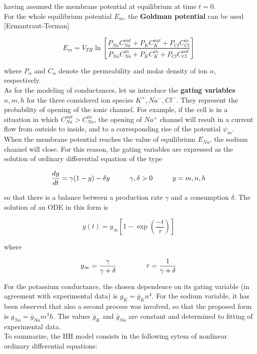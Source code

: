 \documentclass[a4paper]{article}
\begin{document}
	
	having assumed the membrane potential at equilibrium at time $t=0$.\\
	For the whole equilibrium potential $E_m$, the \textbf{Goldman potential} can be used [Ermantraut-Terman]
	
	
	\begin{equation}
	E_m= V_{TH} \ln \left[\frac{P_{Na} C_{Na}^{out} + P_{K} C_K^{out} + P_{Cl} C_{Cl}^{in}}{P_{Na} C_{Na}^{in} + P_{K} C_K^{in} + P_{Cl} C_{Cl}^{out}}\right]
	\end{equation}
	
	where $P_\alpha$ and $C_\alpha$  denote the permeability and molar density of ion $\alpha$, respectively.\\
	As for the modeling of conductances, let us introduce the \textbf{gating variables} $n,m,h$ for the three considered ion species $K^+,Na^-,Cl^-$. They represent the probability of opening of the ionic channel. For example, if the cell is in a situation in which $C_{Na}^{out} > C_{Na}^{in}$, the opening of $Na^+$ channel will result in a current flow from outside to inside, and to a corresponding rise of the potential $\psi_m$. When the membrane potential reaches the value of equilibrium $E_{Na}$, the sodium channel will close. For this reason, the gating variables are expressed as the solution of ordinary differential equation of the type
	
		\begin{equation}
	\frac{dy}{dt} = \gamma (1-y) - \delta y \hspace{1 cm} \gamma,\delta >0  \hspace{1 cm} y = m,n,h
	\end{equation}
	
	so that there is a balance between a production rate $\gamma$ and a consumption $\delta$. The solution of an ODE in this form is
	
	\begin{equation}
	y(t) = y_\infty \left[1 - \exp\left(\frac{-t}{\tau}\right)\right]
	\end{equation}
	
	where
	
	\begin{equation}
	y_\infty = \frac{\gamma}{\gamma + \delta} \hspace{1.5cm} \tau = \frac{1}{\gamma + \delta}
	\end{equation}
	
	For the potassium conductance, the chosen dependence on its gating variable (in agreement with experimental data) is $ g_K = \bar{g}_K n^4$. For the sodium variable, it has been observed that also a second process was involved, so that the proposed form is  $ g_{Na} = \bar{g}_{Na} m^3h$. The values $\bar{g}_K$ and $\bar{g}_{Na}$ are constant and determined to fitting of experimental data.\\
	To summarize, the HH model consists in the following sytem of nonlinear ordinary differential equations:
	
\end{document}
